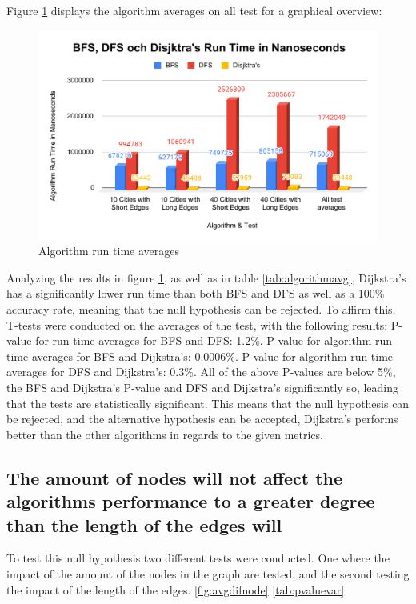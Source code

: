 \documentclass{csfourzero}
\begin{document}
Figure \ref{fig:bfsdfsdijk} displays the algorithm averages on all test for a graphical overview: 
\begin{figure}[h]
\includegraphics [scale = 0.7]{images/BFS_DFS_Dijkstra.pdf}
\caption{Algorithm run time averages }
\label{fig:bfsdfsdijk}
\end{figure}
Analyzing the results in figure \ref{fig:bfsdfsdijk}, as well as in table \ref{tab:algorithmavg}, Dijkstra's has a significantly lower run time than both BFS and DFS as well as a 100\% accuracy rate, meaning that the null hypothesis can be rejected. To affirm this, T-tests were conducted on the averages of the test, with the following results: P-value for run time averages for BFS and DFS: 1.2\%. P-value for algorithm run time averages for BFS and Dijkstra's: 0.0006\%. P-value for algorithm run time averages for DFS and Dijkstra's: 0.3\%. All of the above P-values are below 5\%, the BFS and Dijkstra's P-value and DFS and Dijkstra's significantly so, leading that the tests are statistically significant. This means that the null hypothesis can be rejected, and the alternative hypothesis can be accepted, Dijkstra's performs better than the other algorithms in regards to the given metrics. 

\vspace{1cm} 


\subsection{The amount of nodes will not affect the algorithms performance to a greater degree than the length of the edges will}
To test this null hypothesis two different tests were conducted. One where the impact of the amount of the nodes in the graph are tested, and the second testing the impact of the length of the edges. 
\ref{fig:avgdifnode}
\ref{tab:pvaluevar}
\end{document}
